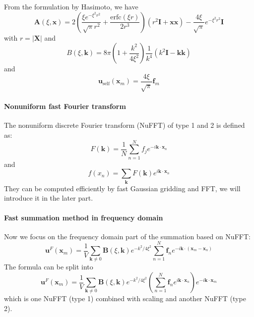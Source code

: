 \documentclass{article}[12pt]
\begin{document}
From the formulation by Hasimoto, we have
\begin{equation}
\mathbf{A}(\xi, \mathbf{x}) = 2 \left(\frac{\xi e^{-\xi^2 r^2}}{\sqrt{\pi} r^2} + \frac{\text{erfc}(\xi r)}{2 r^3}\right) (r^2 \mathbf{I} + \mathbf{x x}) - \frac{4 \xi}{\sqrt{\pi}} e^{-\xi^2 r^2} \mathbf{I}
\end{equation}
with $r = |\mathbf{X}|$ and
\begin{equation}
B(\xi, \mathbf{k}) = 8 \pi \left(1 + \frac{k^2}{4 \xi^2}\right) \frac{1}{k^4}(k^2 \mathbf{I} - \mathbf{k k})
\end{equation}
and
\begin{equation}
\mathbf{u}_{\text{self}}(\mathbf{x}_m) = \frac{4 \xi}{\sqrt{\pi}} \mathbf{f}_m
\end{equation}

\paragraph{Nonuniform fast Fourier transform}
The nonuniform discrete Fourier transform (NuFFT) of type 1 and 2 is defined as:
\begin{equation}
F(\mathbf{k}) = \frac{1}{N} \sum_{n=1}^N f_j e^{-i \mathbf{k} \cdot \mathbf{x}_n}
\end{equation}
and
\begin{equation}
f(x_n) = \sum_{\mathbf{k}} F(\mathbf{k}) e^{i \mathbf{k} \cdot \mathbf{x}_n}
\end{equation}
They can be computed efficiently by fast Gaussian gridding and FFT, we will introduce it in the later part.

\paragraph{Fast summation method in frequency domain}
Now we focus on the frequency domain part of the summation based on NuFFT:
\begin{equation}
\mathbf{u}^F (\mathbf{x}_m) = \frac{1}{V} \sum_{\mathbf{k} \neq 0} \mathbf{B}(\xi, \mathbf{k}) e^{-k^2/4\xi^2}\sum_{n=1}^{N} \mathbf{f}_n e ^{-i \mathbf{k} \cdot (\mathbf{x}_m - \mathbf{x}_n)}
\end{equation}
The formula can be split into 
\begin{equation}
\mathbf{u}^F (\mathbf{x}_m) = \frac{1}{V} \sum_{\mathbf{k} \neq 0} \mathbf{B}(\xi, \mathbf{k}) e^{-k^2/4\xi^2} \left(\sum_{n=1}^{N} \mathbf{f}_n e ^{i \mathbf{k} \cdot \mathbf{x}_n} \right)e ^{-i \mathbf{k} \cdot \mathbf{x}_m}
\end{equation}
which is one NuFFT (type 1) combined with scaling and another NuFFT (type 2).
\end{document}

